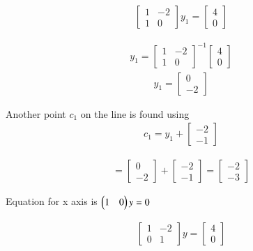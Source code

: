 \documentclass[journal,12pt,twocolumn]{IEEEtran}
\begin{document}
\begin{align}
    \begin{bmatrix}
1 & -2\\
1 & 0 
\end{bmatrix}y_1 =  \begin{bmatrix} 4\\
0
\end{bmatrix}
\end{align}

\begin{align}
    y_1 =  \begin{bmatrix}
1 & -2\\
1 & 0 
\end{bmatrix}^{-1}\begin{bmatrix} 4\\
0
\end{bmatrix}
\end{align}
\begin{align}
    y_1 =  \begin{bmatrix} 0\\
-2
\end{bmatrix}
\end{align}

Another point $c_1$ on the line is found using 
\begin{align}
c_1 = y_1 + \begin{bmatrix} -2\\
-1
\end{bmatrix}
\end{align}

\begin{align}
    = \begin{bmatrix} 0\\
-2
\end{bmatrix} + \begin{bmatrix} -2\\
-1
\end{bmatrix} = \begin{bmatrix} -2\\
-3
\end{bmatrix}
\end{align}

Equation for x axis is $\begin{pmatrix}1 & 0\end{pmatrix}y=0$

\begin{align}
    \begin{bmatrix}
1 & -2\\
0 & 1 
\end{bmatrix}y =  \begin{bmatrix} 4\\
0
\end{bmatrix}
\end{align}
\end{document}
